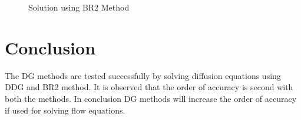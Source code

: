 \documentclass[12pt]{elsarticle}
\begin{document}
\begin{figure}[ht]
\centering
{}
%
%
\caption{Solution using BR2 Method}
\label{BR2}
\end{figure}
\clearpage
\section{Conclusion}
The DG methods are tested successfully by solving diffusion equations using DDG and BR2 method. It is observed that the order of accuracy is second with both the methods. In conclusion DG methods will increase the order of accuracy if used for solving flow equations.




\end{document}
